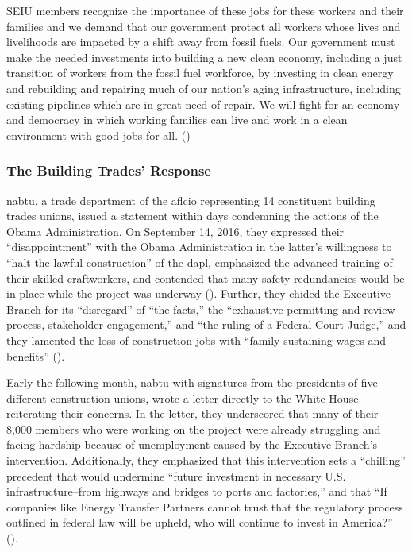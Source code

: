 \documentclass[12pt]{article}
\renewenvironment{quote}
  {\list{}{\leftmargin=\parindent\rightmargin=0pt}%
   \item\relax}
  {\endlist}
\begin{document}
\begin{quote}
SEIU members recognize the importance of these jobs for these workers and their families and we demand that our government protect all workers whose lives and livelihoods are impacted by a shift away from fossil fuels. Our government must make the needed investments into building a new clean economy, including a just transition of workers from the fossil fuel workforce, by investing in clean energy and rebuilding and repairing much of our nation’s aging infrastructure, including existing pipelines which are in great need of repair. We will fight for an economy and democracy in which working families can live and work in a clean environment with good jobs for all. (\cite{nlfUnionsWeighDakota2016})
\end{quote}

\subsubsection{The Building Trades' Response}

\acrfull{nabtu}, a trade department of the \acrshort{aflcio} representing 14 constituent building trades unions, issued a statement within days condemning the actions of the Obama Administration. On September 14, 2016, they expressed their “disappointment” with the Obama Administration in the latter’s willingness to “halt the lawful construction” of the \acrshort{dapl}, emphasized the advanced training of their skilled craftworkers, and contended that many safety redundancies would be in place while the project was underway  (\cite{nabtuStatementObamaAdministration2016}). Further, they chided the Executive Branch for its “disregard” of “the facts,” the “exhaustive permitting and review process, stakeholder engagement,” and “the ruling of a Federal Court Judge,” and they lamented the loss of construction jobs with “family sustaining wages and benefits” (\cite{nabtuStatementObamaAdministration2016}).

Early the following month, \acrshort{nabtu} with signatures from the presidents of five different construction unions, wrote a letter directly to the White House reiterating their concerns. In the letter, they underscored that many of their 8,000 members who were working on the project were already struggling and facing hardship because of unemployment caused by the Executive Branch’s intervention. Additionally, they emphasized that this intervention sets a “chilling” precedent that would undermine “future investment in necessary U.S. infrastructure–from highways and bridges to ports and factories,” and that “If companies like Energy Transfer Partners cannot trust that the regulatory process outlined in federal law will be upheld, who will continue to invest in America?” (\cite{callahanLetterObama2016}).
\end{document}
